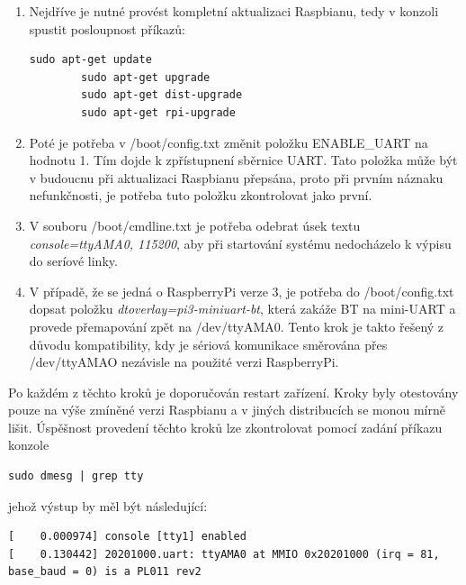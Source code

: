 \begin{enumerate}
	\item Nejdříve je nutné provést kompletní aktualizaci Raspbianu, tedy v konzoli spustit posloupnost příkazů:
	
	\begin{lstlisting}[style=MyCodeBash]
		sudo apt-get update
		sudo apt-get upgrade
		sudo apt-get dist-upgrade
		sudo apt-get rpi-upgrade	
	\end{lstlisting}
					
	\item Poté je potřeba v /boot/config.txt změnit položku ENABLE\_UART na hodnotu 1. Tím dojde k zpřístupnení sběrnice UART. Tato položka může být v budoucnu při aktualizaci Raspbianu přepsána, proto při prvním náznaku nefunkčnosti, je potřeba tuto položku zkontrolovat jako první.
	\item V souboru /boot/cmdline.txt je potřeba odebrat úsek textu \textit{console=ttyAMA0, 115200}, aby při startování systému nedocházelo k výpisu do seríové linky. 
	\item V případě, že se jedná o RaspberryPi verze 3, je potřeba do /boot/config.txt dopsat položku \textit{dtoverlay=pi3-miniuart-bt}, která zakáže BT na mini-UART a provede přemapování zpět na /dev/ttyAMA0. Tento krok je takto řešený z důvodu kompatibility, kdy je sériová komunikace směrována přes /dev/ttyAMAO nezávisle na použité verzi RaspberryPi.
\end{enumerate}

Po každém z těchto kroků je doporučován restart zařízení. Kroky byly otestovány pouze na výše zmíněné verzi Raspbianu a v jiných distribucích se monou mírně lišit. Úspěšnost provedení těchto kroků lze zkontrolovat pomocí zadání příkazu konzole 
	\begin{lstlisting}[style=MyCodeBash]
			sudo dmesg | grep tty
	\end{lstlisting}

jehož výstup by měl být následující:
					
	\begin{lstlisting}[style=MyCodeBash]
[    0.000974] console [tty1] enabled
[    0.130442] 20201000.uart: ttyAMA0 at MMIO 0x20201000 (irq = 81, base_baud = 0) is a PL011 rev2
	\end{lstlisting}
	\vspace{-20pt}



